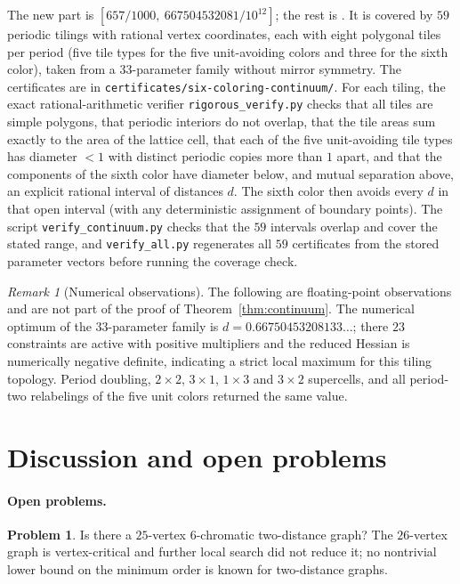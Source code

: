 \documentclass[11pt]{article}
\theoremstyle{definition}
\newtheorem{problem}[theorem]{Problem}
\theoremstyle{remark}
\newtheorem{remark}[theorem]{Remark}
\begin{document}
The new part is $[657/1000,\ 667504532081/10^{12}]$; the rest is
\cite{MPSZ}.  It is covered by $59$ periodic tilings with rational
vertex coordinates, each with eight polygonal tiles per period (five
tile types for the five unit-avoiding colors and three for the sixth
color), taken from a $33$-parameter family without mirror symmetry.  The
certificates are in \texttt{certificates/six-coloring-continuum/}.  For
each tiling, the exact rational-arithmetic verifier
\texttt{rigorous\_verify.py} checks that all tiles are simple polygons,
that periodic interiors do not overlap, that the tile areas sum exactly
to the area of the lattice cell, that each of the five unit-avoiding tile
types has diameter $<1$ with distinct periodic copies more than $1$
apart, and that the components of the sixth color have diameter below,
and mutual separation above, an explicit rational interval of distances
$d$.  The sixth color then avoids every $d$ in that open interval (with
any deterministic assignment of boundary points).  The script
\texttt{verify\_continuum.py} checks that the $59$ intervals overlap and
cover the stated range, and \texttt{verify\_all.py} regenerates all $59$
certificates from the stored parameter vectors before running the
coverage check.

\begin{remark}[Numerical observations]
The following are floating-point observations and are not part of the
proof of Theorem~\ref{thm:continuum}.  The numerical optimum of the
$33$-parameter family is $d=0.66750453208133\ldots$; there $23$
constraints are active with positive multipliers and the reduced Hessian
is numerically negative definite, indicating a strict local maximum for
this tiling topology.  Period doubling, $2\times2$, $3\times1$,
$1\times3$ and $3\times2$ supercells, and all period-two relabelings of
the five unit colors returned the same value.
\end{remark}

\section{Discussion and open problems}\label{sec:open}

\paragraph{Open problems.}

\begin{problem}
Is there a $25$-vertex $6$-chromatic two-distance graph?  The
$26$-vertex graph is vertex-critical and further local search did not
reduce it; no nontrivial lower bound on the minimum order is known for
two-distance graphs.
\end{problem}
\end{document}
